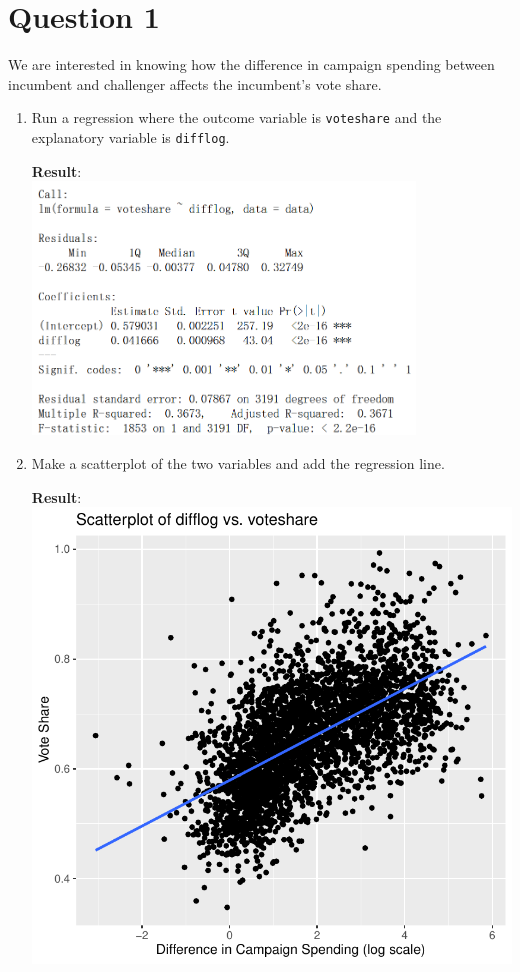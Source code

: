 \documentclass[12pt,letterpaper]{article}
\begin{document}
\section*{Question 1}
\vspace{.25cm}
\noindent We are interested in knowing how the difference in campaign spending between incumbent and challenger affects the incumbent's vote share. 
	\begin{enumerate}
		\item Run a regression where the outcome variable is \texttt{voteshare} and the explanatory variable is \texttt{difflog}.	
			\vspace{.25cm}
			 
			\textbf{Result}:\\
			\includegraphics[width=0.8\textwidth]{plot_1a.png}
			\vspace{.5cm}
		\item Make a scatterplot of the two variables and add the regression line. 	
			\vspace{.25cm}
			 
			\textbf{Result}:\\
			\includegraphics[width=.85\textwidth]{plot_1b.pdf} 

\end{enumerate}
\end{document}
